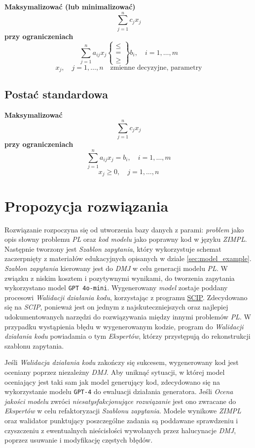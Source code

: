     \noindent
    \textbf{Maksymalizować (lub minimalizować)}
    \[
    \sum_{j=1}^{n} c_j x_j
    \]
    \textbf{przy ograniczeniach}
    \[
    \sum_{j=1}^{n} a_{ij} x_j \left\{
    \begin{array}{l}
    \leq \\
    = \\
    \geq
    \end{array} \right\} b_i, \quad i = 1, \dots, m
    \]
    \[
    x_j, \quad j = 1, \dots, n \quad \text{zmienne decyzyjne, parametry}
    \]

\newpage

\subsection{Postać standardowa}

    \noindent
    \textbf{Maksymalizować}
    \[
    \sum_{j=1}^{n} c_j x_j \tag{9}
    \]
    \textbf{przy ograniczeniach}
    \[
    \sum_{j=1}^{n} a_{ij} x_j = b_i, \quad i = 1, \dots, m \tag{10}
    \]
    \[
    x_j \geq 0, \quad j = 1, \dots, n \tag{11}
    \]



\section{Propozycja rozwiązania}

Rozwiązanie rozpoczyna się od utworzenia bazy danych z parami: \textit{problem} jako opis słowny problemu \textit{PL} oraz \textit{kod modelu} jako poprawny kod w języku \textit{ZIMPL}. Następnie tworzony jest \textit{Szablon zapytania}, który wykorzystuje schemat zaczerpnięty z materiałów edukacyjnych opisanych w dziale \ref{sec:model_example}. \textit{Szablon zapytania} kierowany jest do \textit{DMJ} w celu generacji modelu \textit{PL}. W związku z niskim kosztem i pozytywnymi wynikami, do tworzenia zapytania wykorzystano model \texttt{GPT 4o-mini}. Wygenerowany \textit{model} zostaje poddany procesowi \textit{Walidacji działania kodu}, korzystając z programu \href{https://www.scipopt.org/}{SCIP}. Zdecydowano się na \textit{SCIP}, ponieważ jest on jednym z najskuteczniejszych oraz najlepiej udokumentowanych narzędzi do rozwiązywania między innymi problemów \textit{PL}. W przypadku wystąpienia błędu w wygenerowanym kodzie, program do \textit{Walidacji działania kodu} powiadamia o tym \textit{Ekspertów}, którzy przystępują do rekonstrukcji szablonu zapytania.

Jeśli \textit{Walidacja działania kodu} zakończy się sukcesem, wygenerowany kod jest oceniany poprzez niezależny \textit{DMJ}. Aby uniknąć sytuacji, w której model oceniający jest taki sam jak model generujący kod, zdecydowano się na wykorzystanie modelu \texttt{GPT-4} do ewaluacji działania generatora. Jeśli \textit{Ocena jakości modelu} zwróci \textit{niesatysfakcjonujące rozwiązanie} jest ono zwracane do \textit{Ekspertów} w celu refaktoryzacji \textit{Szablonu zapytania}. Modele wynikowe \textit{ZIMPL} oraz walidator punktujący poszczególne zadania są poddawane sprawdzeniu i czyszczeniu z ewentualnych nieścisłości wywołanych przez halucynacje \textit{DMJ}, poprzez usuwanie i modyfikację częstych błędów.

